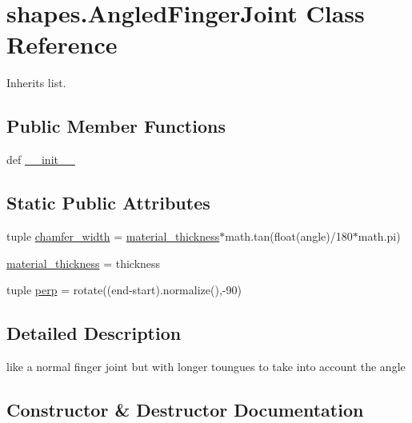 \hypertarget{classshapes_1_1_angled_finger_joint}{}\section{shapes.\+Angled\+Finger\+Joint Class Reference}
\label{classshapes_1_1_angled_finger_joint}


Inherits list.

\subsection*{Public Member Functions}
\begin{DoxyCompactItemize}
\item 
def \hyperlink{classshapes_1_1_angled_finger_joint_a23ba20478302aa6b371ab7a912d8814f}{\+\_\+\+\_\+init\+\_\+\+\_\+}
\end{DoxyCompactItemize}
\subsection*{Static Public Attributes}
\begin{DoxyCompactItemize}
\item 
tuple \hyperlink{classshapes_1_1_angled_finger_joint_acdec495b67f9651786414eefc0d20b54}{chamfer\+\_\+width} = \hyperlink{classshapes_1_1_angled_finger_joint_a3c19348b7cc2e158b580b9701c5d1612}{material\+\_\+thickness}$\ast$math.\+tan(float(angle)/180$\ast$math.\+pi)
\item 
\hyperlink{classshapes_1_1_angled_finger_joint_a3c19348b7cc2e158b580b9701c5d1612}{material\+\_\+thickness} = thickness
\item 
tuple \hyperlink{classshapes_1_1_angled_finger_joint_aca8911daca5c644771098e059c44ca4e}{perp} = rotate((end-\/start).normalize(),-\/90)
\end{DoxyCompactItemize}


\subsection{Detailed Description}
\begin{DoxyVerb}like a normal finger joint but with longer toungues to take into account the angle\end{DoxyVerb}
 

\subsection{Constructor \& Destructor Documentation}
\hypertarget{classshapes_1_1_angled_finger_joint_a23ba20478302aa6b371ab7a912d8814f}{}
